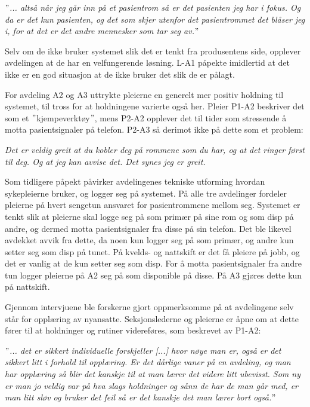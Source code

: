 \noindent
\textit{$"$... altså når jeg går inn på et pasientrom så er det pasienten jeg har i fokus. Og da er det kun pasienten, og det som skjer utenfor det pasientrommet det blåser jeg i, for at det er det andre mennesker som tar seg av.$"$}

\noindent
Selv om de ikke bruker systemet slik det er tenkt fra produsentens side, opplever avdelingen at de har en velfungerende løsning. L-A1 påpekte imidlertid at det ikke er en god situasjon at de ikke bruker det slik de er pålagt.

\noindent
For avdeling A2 og A3 uttrykte pleierne en generelt mer positiv holdning til systemet, til tross for at holdningene varierte også her. Pleier P1-A2 beskriver det som et $"$kjempeverktøy$"$, mens P2-A2 opplever det til tider som stressende å motta pasientsignaler på telefon. P2-A3 så derimot ikke på dette som et problem: 

\noindent
\textit{Det er veldig greit at du kobler deg på rommene som du har, og at det ringer først til deg. Og at jeg kan avvise det. Det synes jeg er greit.}

\noindent
Som tidligere påpekt påvirker avdelingenes tekniske utforming hvordan sykepleierne bruker, og logger seg på systemet. På alle tre avdelinger fordeler pleierne på hvert sengetun ansvaret for pasientrommene mellom seg. Systemet er tenkt slik at pleierne skal logge seg på som primær på sine rom og som disp på andre, og dermed motta pasientsignaler fra disse på sin telefon. Det ble likevel avdekket avvik fra dette, da noen kun logger seg på som primær, og andre kun setter seg som disp på tunet. På kvelds- og nattskift er det få pleiere på jobb, og det er vanlig at de kun setter seg som disp. For å motta pasientsignaler fra andre tun logger pleierne på A2 seg på som disponible på disse. På A3 gjøres dette kun på nattskift. 

\noindent
Gjennom intervjuene ble forskerne gjort oppmerksomme på at avdelingene selv står for opplæring av nyansatte. Seksjonslederne og pleierne er åpne om at dette fører til at holdninger og rutiner videreføres, som beskrevet av P1-A2:

\noindent
\textit{$"$... det er sikkert individuelle forskjeller [...] hvor nøye man er, også er det sikkert litt i forhold til opplæring. Er det dårlige vaner på en avdeling, og man har opplæring så blir det kanskje til at man lærer det videre litt ubevisst. Som ny er man jo veldig var på hva slags holdninger og sånn de har de man går med, er man litt sløv og bruker det feil så er det kanskje det man lærer bort også.$"$}

